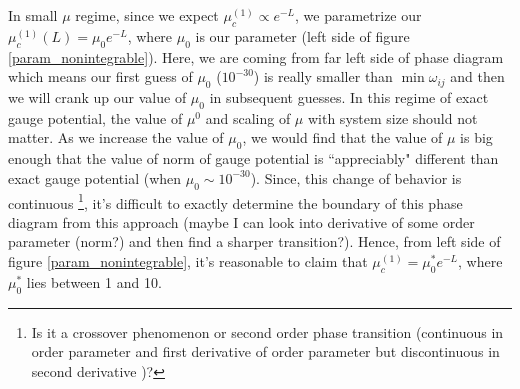 \documentclass[11pt,a4paper]{article}
\begin{document}
In small $\mu$ regime, since we expect $\mu_c^{(1)} \propto e^{-L}$, we parametrize our $\mu_c^{(1)}(L)= \mu_0 e^{-L}$, where $\mu_0$ is our parameter (left side of figure \ref{param_nonintegrable}). Here, we are coming from far left side of phase diagram which means our first guess of $\mu_0$ ($10^{-30}$) is really smaller than $\min{\omega_{ij}}$ and then we will crank up our value of $\mu_0$ in subsequent guesses. In this regime of exact gauge potential, the value of $\mu^0$ and scaling of $\mu$ with system size should not matter. As we increase the value of $\mu_0$, we would find that the value of $\mu$ is big enough that the value of norm of gauge potential is ``appreciably" different than exact gauge potential (when $\mu_0 \sim 10^{-30}$). Since, this change of behavior is continuous \footnote{Is it a crossover phenomenon or  second order phase transition (continuous in order parameter and first derivative of order parameter but discontinuous  in second derivative )?}, it's difficult to exactly determine the boundary of this phase diagram from this approach (maybe I can look into derivative of some order parameter (norm?) and then find a sharper transition?). Hence, from left side of figure \ref{param_nonintegrable}, it's reasonable to claim that $\mu_c^{(1)}= \mu_0^*e^{-L}$, where $\mu_0^*$ lies between 1 and 10.
\end{document}
